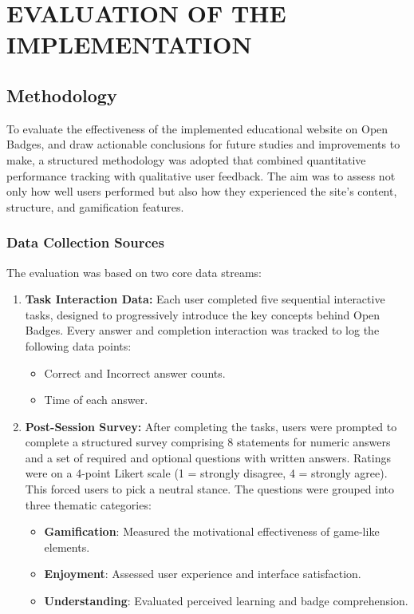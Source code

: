 \section{EVALUATION OF THE IMPLEMENTATION}

\subsection{Methodology}

To evaluate the effectiveness of the implemented educational website on Open Badges, and draw actionable conclusions for future studies and improvements to make, a structured methodology was adopted that combined quantitative performance tracking with qualitative user feedback. 
The aim was to assess not only how well users performed but also how they experienced the site’s content, structure, and gamification features. 

\subsubsection{Data Collection Sources}
The evaluation was based on two core data streams:
\begin{enumerate}
    \item \textbf{Task Interaction Data:} Each user completed five sequential interactive tasks, designed to progressively introduce the key concepts behind Open Badges. 
    Every answer and completion interaction was tracked to log the following data points:
    \begin{itemize}
        \item Correct and Incorrect answer counts.
        \item Time of each answer.
    \end{itemize}
    \item \textbf{Post-Session Survey:} After completing the tasks, users were prompted to complete a structured survey comprising 8 statements for numeric answers and a set of required and optional questions with written answers. 
    Ratings were on a 4-point Likert scale (1 = strongly disagree, 4 = strongly agree). 
    This forced users to pick a neutral stance. 
    The questions were grouped into three thematic categories:
    \begin{itemize}
        \item \textbf{Gamification}: Measured the motivational effectiveness of game-like elements.
        \item \textbf{Enjoyment}: Assessed user experience and interface satisfaction.
        \item \textbf{Understanding}: Evaluated perceived learning and badge comprehension.
    \end{itemize}
\end{enumerate}

